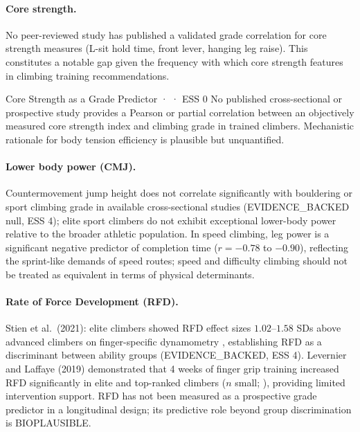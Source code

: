 \paragraph{Core strength.}
No peer-reviewed study has published a validated grade correlation for core strength measures (L-sit hold time, front lever, hanging leg raise).
This constitutes a notable gap given the frequency with which core strength features in climbing training recommendations.

\begin{toverifybox}{Core Strength as a Grade Predictor · \toverify · ESS 0}
No published cross-sectional or prospective study provides a Pearson or partial correlation between an objectively measured core strength index and climbing grade in trained climbers.
Mechanistic rationale for body tension efficiency is plausible but unquantified.
\end{toverifybox}

\paragraph{Lower body power (CMJ).}
Countermovement jump height does not correlate significantly with bouldering or sport climbing grade in available cross-sectional studies (EVIDENCE\_BACKED null, ESS 4); elite sport climbers do not exhibit exceptional lower-body power relative to the broader athletic population.
In speed climbing, leg power is a significant negative predictor of completion time ($r = -0.78$ to $-0.90$), reflecting the sprint-like demands of speed routes; speed and difficulty climbing should not be treated as equivalent in terms of physical determinants.

\paragraph{Rate of Force Development (RFD).}
Stien et al.\ (2021): elite climbers showed RFD effect sizes $1.02$--$1.58$ SDs above advanced climbers on finger-specific dynamometry \cite{SVS+21}, establishing RFD as a discriminant between ability groups (EVIDENCE\_BACKED, ESS 4).
Levernier and Laffaye (2019) demonstrated that 4 weeks of finger grip training increased RFD significantly in elite and top-ranked climbers ($n$ small; \cite{LL19}), providing limited intervention support.
RFD has not been measured as a prospective grade predictor in a longitudinal design; its predictive role beyond group discrimination is BIOPLAUSIBLE.

